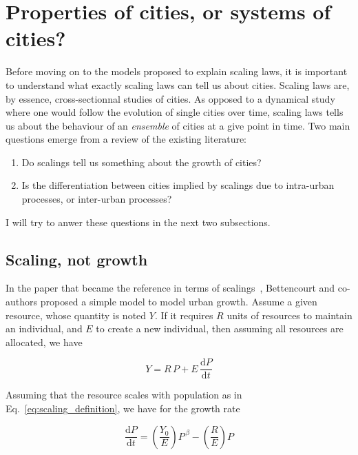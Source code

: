 \section{Properties of cities, or systems of cities?}
\label{sub:what_can_scalings_tell_us_about_cities_and_systems_of_cities_}

Before moving on to the models proposed to explain scaling laws, 
it is important to understand what exactly scaling laws can tell us about
cities. Scaling laws are, by essence, cross-sectionnal studies of cities. As
opposed to a dynamical study where one would follow the evolution of single
cities over time, scaling laws tells us about the behaviour of an
\emph{ensemble} of cities at a give point in time. Two main questions emerge
from a review of the existing literature:

\begin{enumerate}
    \item Do scalings tell us something about the growth of cities?
    \item Is the differentiation between cities implied by scalings due to
        intra-urban processes, or inter-urban processes?
\end{enumerate}

I will try to anwer these questions in the next two subsections.

\subsection{Scaling, not growth}
\label{sub:scaling_not_growth}

In the paper that became the reference in terms of
scalings~\cite{Bettencourt:2007}, Bettencourt and co-authors proposed a simple
model to model urban growth. Assume a given resource, whose quantity is noted
$Y$. If it requires $R$ units of resources to maintain an individual, and $E$ to
create a new individual, then assuming all resources are allocated, we have

\begin{equation}
    Y = R\,P + E\,\frac{\mathrm{d}P}{\mathrm{d}t}
    \label{eq:growth_resource_allocation}
\end{equation}

Assuming that the resource scales with population as in
Eq.~\ref{eq:scaling_definition}, we have for the growth rate

\begin{equation}
    \frac{\mathrm{d}P}{\mathrm{d}t} = \left(\frac{Y_0}{E}\right) P^{\,\beta} -
\left(\frac{R}{E}\right)P 
    \end{equation}

